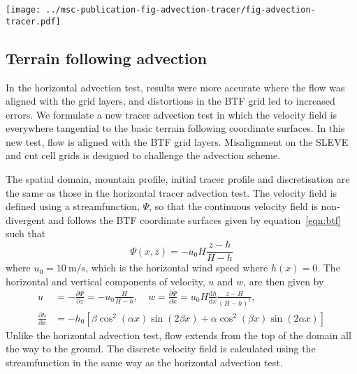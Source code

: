 \documentclass[twocol]{ametsoc}
\begin{document}
\begin{figure*}
	\centering
	\texttt{[image: ../msc-publication-fig-advection-tracer/fig-advection-tracer.pdf]}
%
	\caption{Horizontally advected tracer contours at \(t = \SI{0}{\second}\), \SI{5000}{\second} and \SI{10000}{\second} using (a) centred linear scheme on a BTF grid, the upwind-biased cubic scheme on (b) the cut cell grid, (d) the BTF grid, and (c) the fourth order scheme from \citet{schaer2002} on the BTF grid, with contour intervals every 0.1.  Errors on the BTF grid at \(t = \SI{10000}{\second}\) are shown for (e) the fourth order scheme from \citet{schaer2002}, and (f) the upwind-biased cubic scheme, with contour intervals every 0.01.  Negative contours denoted by dotted lines.  The terrain profile is also shown immediately above the $x$ axis.}
	\label{fig:advection-tracer}
\end{figure*}


\subsection{Terrain following advection}
In the horizontal advection test, results were more accurate where the flow was aligned with the grid layers, and distortions in the BTF grid led to increased errors.  We formulate a new tracer advection test in which the velocity field is everywhere tangential to the basic terrain following coordinate surfaces.  In this new test, flow is aligned with the BTF grid layers.  Misalignment on the SLEVE and cut cell grids is designed to challenge the advection scheme.

The spatial domain, mountain profile, initial tracer profile and discretisation are the same as those in the horizontal tracer advection test.  The velocity field is defined using a streamfunction, $\Psi$, so that the continuous velocity field is non-divergent and follows the BTF coordinate surfaces given by equation~\ref{eqn:btf} such that
\begin{equation}
	\Psi(x,z) = - u_0 H \frac{z - h}{H - h}
\end{equation}
where $u_0 = \SI{10}{\meter\per\second}$, which is the horizontal wind speed where $h(x) = 0$.
The horizontal and vertical components of velocity, $u$ and $w$, are then given by
\begin{align}
	u &= - \frac{\partial \Psi}{\partial z} = - u_0 \frac{H}{H - h}, \quad w = \frac{\partial \Psi}{\partial x} = u_0 H \frac{\mathrm{d} h}{\mathrm{d} x} \frac{z - H}{\left( H - h \right)^2}, \nonumber \\
	\frac{\partial h}{\partial x} &= - h_0 \left[ 
		\beta \cos^2 \left( \alpha x \right) \sin \left( 2 \beta x \right) +
		\alpha \cos^2 \left( \beta x \right) \sin \left( 2 \alpha x \right)
	\right]
\end{align}
Unlike the horizontal advection test, flow extends from the top of the domain all the way to the ground.  The discrete velocity field is calculated using the streamfunction in the same way as the horizontal advection test.
\end{document}
